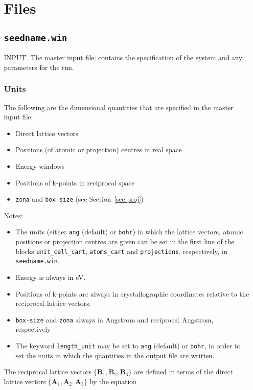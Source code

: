 \chapter{Files}


\section{{\tt seedname.win}}
INPUT. The master input file; contains the specification of the system
and any parameters for the run. 

\subsection{Units}

The following are the dimensional quantities that are
specified in the master input file:

\begin{itemize}
\item Direct lattice vectors
\item Positions (of atomic or projection) centres in real space
\item Energy windows
\item Positions of k-points in reciprocal space
\item \verb#zona# and \verb#box-size# (see Section~\ref{sec:proj})
\end{itemize}

Notes:

\begin{itemize}
\item The units (either \verb#ang#
  (default) or \verb#bohr#) in which the lattice vectors, atomic
  positions or projection centres are given can be set in the first
  line of the blocks 
  \verb#unit_cell_cart#, \verb#atoms_cart# and \verb#projections#,
  respectively, in \verb#seedname.win#.
\item Energy is always in eV.
\item Positions of k-points are always in crystallographic
  coordinates relative to the reciprocal lattice vectors.
\item \verb#box-size# and \verb#zona# always in Angstrom and
  reciprocal Angstrom, respectively
\item The keyword \verb#length_unit# may be set to \verb#ang#
  (default) or \verb#bohr#, in order to set the units in which the
  quantities in the output file are written.
\end{itemize}

The reciprocal lattice vectors
$\{\mathbf{B}_{1},\mathbf{B}_{2},\mathbf{B}_{3}\}$ are defined in
terms
of the direct lattice vectors
$\{\mathbf{A}_{1},\mathbf{A}_{2},\mathbf{A}_{3}\}$ by the equation


